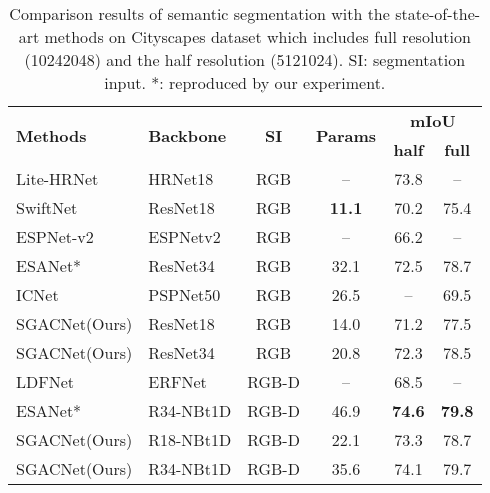 \documentclass[journal,twoside,web]{ieeecolor}
\begin{document}
\begin{table}[!t]
	\centering
	\renewcommand{\arraystretch}{1.08}\caption{Comparison results of semantic segmentation with the state-of-the-art methods on Cityscapes dataset which includes full resolution (10242048) and the half resolution (5121024). SI: segmentation input. *: reproduced by our experiment.}
	\footnotesize
	\begin{tabular}{llcccc}
		\toprule \multicolumn{1}{l}{\multirow{2}{*}{\textbf{Methods}}}     &
		\multicolumn{1}{l}{\multirow{2}{*}{\textbf{Backbone}}}     &
		\multicolumn{1}{c}{\multirow{2}{*}{\textbf{SI}}}     &
		\multicolumn{1}{c}{\multirow{2}{*}{\textbf{Params}}} 						&
		\multicolumn{2}{c}{\textbf{mIoU}} \\ 
		\cmidrule(r){5-6} 
		\multicolumn{4}{c}{}                                  &      
		\multicolumn{1}{c}{\textbf{half}}      & 
		\multicolumn{1}{c}{\textbf{full}}	     \\ 
		\midrule
Lite-HRNet~\cite{Lite-HRNet}       & HRNet18          & RGB   & --  &  73.8 &  --       \\
		SwiftNet~\cite{SwiftNet}           & ResNet18   	& RGB   & \textbf{11.1}&  70.2 & 75.4     \\
      ESPNet-v2~\cite{ESPNetv2}          & ESPNetv2   	& RGB   & --  &  66.2 &  --       \\
      ESANet*~\cite{ESANet}              & ResNet34      & RGB   & 32.1&  72.5 & 78.7    \\
		ICNet~\cite{ICNet}                 & PSPNet50  	& RGB   & 26.5 &   --  & 69.5       \\
		SGACNet(Ours)                      & ResNet18  	& RGB   & 14.0&  71.2 &77.5 \\
		SGACNet(Ours)                      & ResNet34  	& RGB   & 20.8&  72.3 & 78.5    \\ 
		\midrule
		LDFNet~\cite{LDFNet}               & ERFNet 	    & RGB-D &  -- &  68.5 & --        \\
        ESANet*~\cite{ESANet}              & R34-NBt1D      & RGB-D & 46.9&  \textbf{74.6} & \textbf{79.8}    \\
\midrule
		SGACNet(Ours)                      & R18-NBt1D      & RGB-D & 22.1&  73.3 & 78.7 \\
		SGACNet(Ours)                      & R34-NBt1D     & RGB-D & 35.6&  74.1 & 79.7  \\
		\bottomrule
	\end{tabular}\label{tab:city}\end{table}
\end{document}
